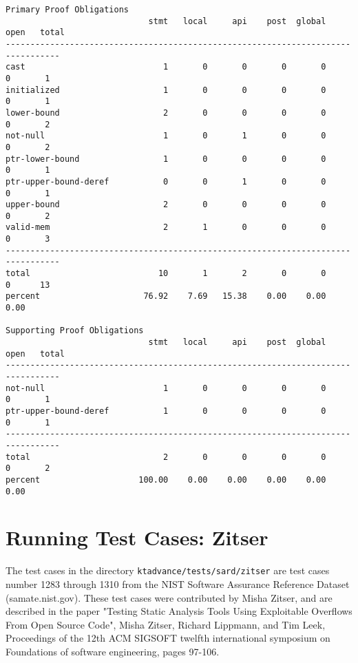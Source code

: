 \documentclass[11pt]{article}
\begin{document}
\begin{small}
\begin{verbatim}
Primary Proof Obligations
                             stmt   local     api    post  global    open   total
---------------------------------------------------------------------------------
cast                            1       0       0       0       0       0       1
initialized                     1       0       0       0       0       0       1
lower-bound                     2       0       0       0       0       0       2
not-null                        1       0       1       0       0       0       2
ptr-lower-bound                 1       0       0       0       0       0       1
ptr-upper-bound-deref           0       0       1       0       0       0       1
upper-bound                     2       0       0       0       0       0       2
valid-mem                       2       1       0       0       0       0       3
---------------------------------------------------------------------------------
total                          10       1       2       0       0       0      13
percent                     76.92    7.69   15.38    0.00    0.00    0.00

Supporting Proof Obligations
                             stmt   local     api    post  global    open   total
---------------------------------------------------------------------------------
not-null                        1       0       0       0       0       0       1
ptr-upper-bound-deref           1       0       0       0       0       0       1
---------------------------------------------------------------------------------
total                           2       0       0       0       0       0       2
percent                    100.00    0.00    0.00    0.00    0.00    0.00
\end{verbatim}
\end{small}

\section{Running Test Cases: Zitser}

The test cases in the directory {\tt ktadvance/tests/sard/zitser} 
are test cases number 1283 through 1310 from the NIST Software Assurance Reference Dataset
(samate.nist.gov). These test cases were contributed by Misha Zitser, and are described 
in the paper "Testing Static Analysis Tools Using Exploitable Overflows From Open Source 
Code", Misha Zitser, Richard Lippmann, and Tim Leek, Proceedings of the 12th ACM SIGSOFT 
twelfth international symposium on Foundations of software engineering, pages 97-106.
\end{document}
